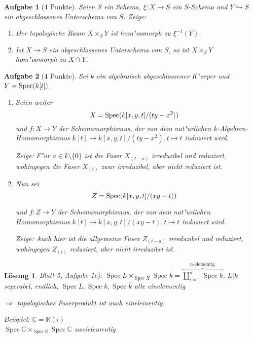 \documentclass[paper = A4, fontsize=12pt, numbers=noendperiod, chapterprefix=true]{scrbook}
\theoremstyle{break}
\newtheorem{Aufg}{Aufgabe}
\newtheorem{Loes}{L\"osung}
\theoremstyle{nonumberbreak}
\theoremstyle{nonumberplain}
\DeclareMathOperator{\Spec}{Spec}
\newcommand{\R}{\mathbb{R}}
\newcommand{\C}{\mathbb{C}}
\newcommand{\X}{\times}
\begin{document}
\begin{Aufg}[4 Punkte]
Seien $S$ ein Schema, $\xi \colon X \to S$ ein $S$-Schema und $Y \hookrightarrow S$ ein abgeschlossenes Unterschema von $S$. Zeige:
\begin{enumerate}%
 \item Der topologische Raum $X \times_S Y$ ist hom"oomorph zu $\xi^{-1}(Y)$.
 \item Ist $X \to S$ ein abgeschlossenes Unterschema von $S$, so ist $X \times_S Y$ hom"oomorph zu $X \cap Y$.
\end{enumerate}
\end{Aufg}


\begin{Aufg}[4 Punkte]
Sei $k$ ein algebraisch abgeschlossener K"orper und $Y = \textup{Spec}(k[t])$.
\begin{enumerate}%
\item Seien weiter 
$$X = \textup{Spec}(k[x,y,t]/(ty-x^2))$$
und $f\colon X \rightarrow Y$ der Schemamorphismus, der von dem nat"urlichen $k$-Algebren-Homomorphismus $k[t] \rightarrow k[x,y,t]/(ty-x^2), t \mapsto t$ induziert wird.

Zeige: F"ur $a \in k \setminus\{0\}$ ist die Faser $X_{(t-a)}$ irreduzibel und reduziert, wohingegen die Faser $X_{(t)}$ zwar irreduzibel, aber nicht reduziert ist.
\item Nun sei
$$Z =\textup{Spec}(k[x,y,t]/(xy-t))$$

 und $f \colon Z \to Y$ der Schemamorphismus, der von dem nat"urlichen Homomorphismus ${k[t] \rightarrow k[x,y,t]/(xy-t)}, t \mapsto t$ induziert wird. 
 
 Zeige:
Auch hier ist die allgemeine Faser $Z_{(t-a)}$ irreduzibel und reduziert, wohingegen $Z_{(t)}$ reduziert, aber nicht irreduzibel ist.
\end{enumerate}
\end{Aufg}

\begin{Loes}
\emph{Blatt 5, Aufgabe 1c):} $\Spec L \X_{\Spec X} \Spec \overline k = \overbrace{\coprod\limits_{i=1}^n \Spec \overline k}^{n\text{-elementig}}$, $L|k$ seperabel, endlich, $\Spec L, \Spec k, \Spec \overline k$ alle einelementig

$\Rightarrow $ topologisches Faserprodukt ist auch einelementig.

\emph{Beispiel:} $\C = \R(i)$\\
$\Spec \C \X_{\Spec \R} \Spec \C$ zweielementig
\end{Loes}
\end{document}
